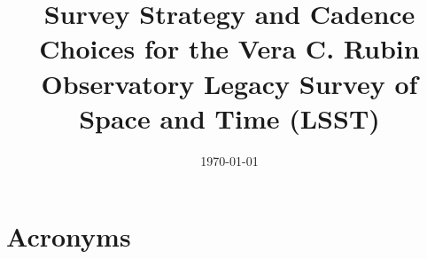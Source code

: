\documentclass[modern]{aastex62}
\begin{document}


\date{\today}
\title{Survey Strategy and Cadence Choices for the Vera C. Rubin Observatory Legacy Survey of Space and Time (LSST)}



\tableofcontents

\clearpage


\clearpage

\clearpage

\clearpage

\clearpage

\clearpage

\clearpage


%

\clearpage



\clearpage
\section{Acronyms} \label{sec:acronyms}

\end{document}
